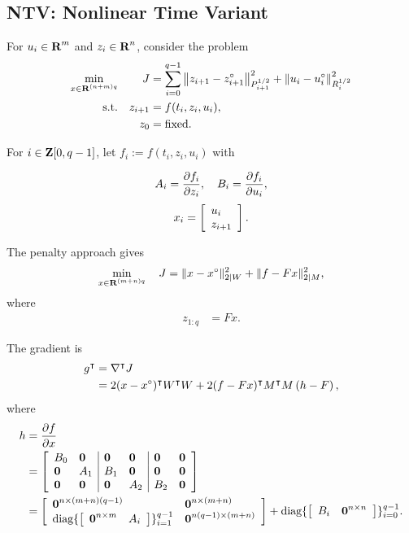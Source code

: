 \documentclass{article}
\begin{document}
\subsection{NTV: Nonlinear Time Variant}

    For $u_i\in\textbf{R}^m$ and $z_i\in\textbf{R}^n$, consider the problem
    \begin{align*}
        \min_{x\in\textbf{R}^{(n+m)q}}\quad\quad J&=\sum_{i=0}^{q-1}
        \left\|z_{i+1}-z_{i+1}^\circ\right\|_{P_{i+1}^{1/2}}^2
        +\left\|u_i-u_i^\circ\right\|_{R_i^{1/2}}^2\\
        \text{s.t.}\quad z_{i+1} &= f(t_i,z_i,u_i),\\
            z_{0} & = \text{fixed}.
    \end{align*}

    For $i\in\textbf{Z}[0,q-1]$, let $f_i := f(t_i,z_i,u_i)$ with

    \begin{align*}
        A_i = \frac{\partial f_i}{\partial z_i},\quad B_i = \frac{\partial f_i}{\partial u_i},
    \end{align*}
    \begin{align*}
        x_i =\left[\begin{array}{lllllllllllllllllll}u_i\\z_{i+1}\end{array}\right].
    \end{align*}

    The penalty approach gives
    \begin{align*}
        \min_{x\in\textbf{R}^{(m+n)q}}\quad J = \|x-x^\circ\|_{2|W}^2 + \|f- Fx \|_{2|M}^2,
    \end{align*}
    where
    \begin{align*}
        z_{1:q}&=Fx.
    \end{align*}

    The gradient is
    \begin{align*}
        g^\intercal&=\nabla^\intercal J\\
        &=2(x-x^\circ)^\intercal W^\intercal W + 2(f-Fx)^\intercal M^\intercal M\left(h-F\right),
    \end{align*}
    where 
    \begin{align*}
        h&=\frac{\partial f}{\partial x}\\
        &= \left[\begin{array}{ll|ll|ll}
            B_0
        &
            \textbf{0} 
        &
            \textbf{0} 
        &
            \textbf{0} 
        &
            \textbf{0} 
        &
            \textbf{0} 
    \\
            \textbf{0} 
        &
            A_1
        &
            B_1                   
        &
            \textbf{0} 
        &
            \textbf{0} 
        &
            \textbf{0} 
    \\
            \textbf{0} 
        &
            \textbf{0} 
        &
            \textbf{0} 
        &
            A_2
        &
            B_2
        &
            \textbf{0} 
    \end{array}
    \right]\\
    &=\left[\begin{array}{lllllllllllllllllll}\textbf{0}^{n\times (m+n)(q-1)} & \textbf{0}^{n\times (m+n)} \\
        \text{diag}\{\left[\begin{array}{lllllllllllllllllll}\textbf{0}^{n\times m}&A_i\end{array}\right]\}_{i=1}^{q-1} & \textbf{0}^{n(q-1)\times(m+n)} \end{array}\right]+
        \text{diag}\{\left[\begin{array}{lllllllllllllllllll}B_i&\textbf{0}^{n\times n} \end{array}\right]\}_{i=0}^{q-1}.
    \end{align*}
\end{document}
